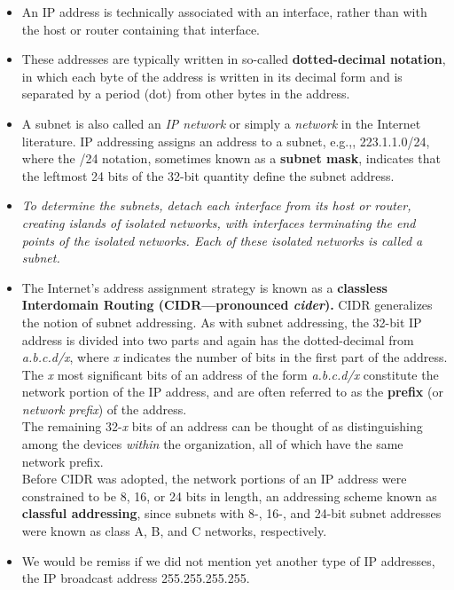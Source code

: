 \begin{itemize}
\item
An IP address is technically associated with an interface, rather than with the host or router containing that interface.

\item
These addresses are typically written in so-called \textbf{dotted-decimal notation}, in which each byte of the address is written in its decimal form and is separated by a period (dot) from other bytes in the address.

\item
A subnet is also called an \textit{IP network} or simply a \textit{network} in the Internet literature. IP addressing assigns an address to a subnet, e.g.,, 223.1.1.0/24, where the /24 notation, sometimes known as a \textbf{subnet mask}, indicates that the leftmost 24 bits of the 32-bit quantity define the subnet address.

\item
\textit{To determine the subnets, detach each interface from its host or router, creating islands of isolated networks, with interfaces terminating the end points of the isolated networks. Each of these isolated networks is called a \textit{subnet}.}

\item
The Internet's address assignment strategy is known as a \textbf{classless Interdomain Routing (CIDR---pronounced \textit{cider}).} CIDR generalizes the notion of subnet addressing. As with subnet addressing, the 32-bit IP address is divided into two parts and again has the dotted-decimal from \textit{a.b.c.d/x}, where \textit{x} indicates the number of bits in the first part of the address.\\
The \textit{x} most significant bits of an address of the form \textit{a.b.c.d/x} constitute the network portion of the IP address, and are often referred to as the \textbf{prefix} (or \textit{network prefix}) of the address.\\
The remaining 32-\textit{x} bits of an address can be thought of as distinguishing among the devices \textit{within} the organization, all of which have the same network prefix.\\
Before CIDR was adopted, the network portions of an IP address were constrained to be 8, 16, or 24 bits in length, an addressing scheme known as \textbf{classful addressing}, since subnets with 8-, 16-, and 24-bit subnet addresses were known as class A, B, and C networks, respectively.

\item
We would be remiss if we did not mention yet another type of IP addresses, the IP broadcast address 255.255.255.255.


\end{itemize}
